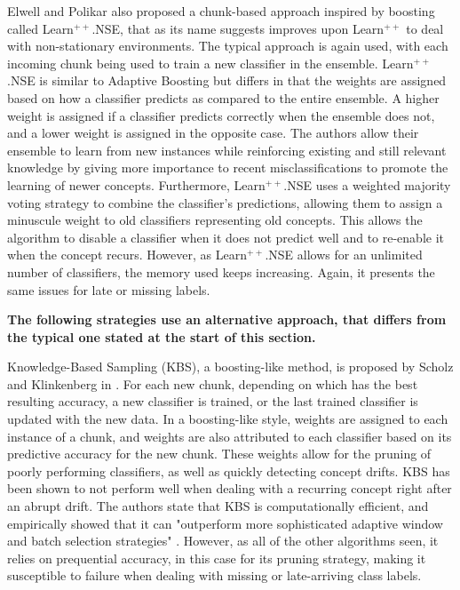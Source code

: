 Elwell and Polikar also proposed a chunk-based approach inspired by boosting \cite{elwell2011incremental} called Learn$^{++}$.NSE, that as its name suggests improves upon Learn$^{++}$ to deal with non-stationary environments. The typical approach is again used, with each incoming chunk being used to train a new classifier in the ensemble. Learn$^{++}$.NSE is similar to Adaptive Boosting but differs in that the weights are assigned based on how a classifier predicts as compared to the entire ensemble. A higher weight is assigned if a classifier predicts correctly when the ensemble does not, and a lower weight is assigned in the opposite case. The authors allow their ensemble to learn from new instances while reinforcing existing and still relevant knowledge by giving more importance to recent misclassifications to promote the learning of newer concepts. Furthermore, Learn$^{++}$.NSE uses a weighted majority voting strategy to combine the classifier's predictions, allowing them to assign a minuscule weight to old classifiers representing old concepts. This allows the algorithm to disable a classifier when it does not predict well and to re-enable it when the concept recurs. However, as Learn$^{++}$.NSE allows for an unlimited number of classifiers, the memory used keeps increasing. Again, it presents the same issues for late or missing labels.

\textbf{The following strategies use an alternative approach, that differs from the typical one stated at the start of this section.}

Knowledge-Based Sampling (KBS), a boosting-like method, is proposed by Scholz and Klinkenberg in \cite{scholz2005ensemble}. For each new chunk, depending on which has the best resulting accuracy, a new classifier is trained, or the last trained classifier is updated with the new data. In a boosting-like style, weights are assigned to each instance of a chunk, and weights are also attributed to each classifier based on its predictive accuracy for the new chunk. These weights allow for the pruning of poorly performing classifiers, as well as quickly detecting concept drifts. KBS has been shown to not perform well when dealing with a recurring concept right after an abrupt drift. The authors state that KBS is computationally efficient, and empirically showed that it can "outperform more sophisticated adaptive window and batch selection strategies" \cite{scholz2005ensemble}. However, as all of the other algorithms seen, it relies on prequential accuracy, in this case for its pruning strategy, making it susceptible to failure when dealing with missing or late-arriving class labels.

